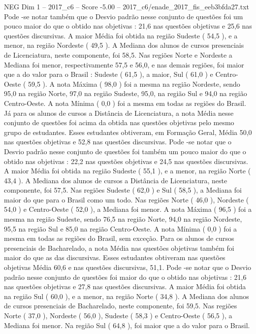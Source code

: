\begin{textsample}{NEG Dim 1 – 2017\_c6 – Score -5.00 – 2017\_c6/enade\_2017\_fis\_eeb3bfda27.txt}
Pode -se notar também que o Desvio padrão nesse conjunto de questões foi um pouco maior do que o obtido nas objetivas : 21,6 nas questões objetivas e 25,6 nas questões discursivas.
A maior Média foi obtida na região Sudeste ( 54,5 ), e a menor, na região Nordeste ( 49,5 ).
A Mediana dos alunos de cursos presenciais de Licenciatura, neste componente, foi 58,5.
Nas regiões Norte e Nordeste a Mediana foi menor, respectivamente 57,5 e 56,0, e nas demais regiões, foi maior que a do valor para o Brasil : Sudeste ( 61,5 ), a maior, Sul ( 61,0 ) e Centro-Oeste ( 59,5 ).
A nota Máxima ( 98,0 ) foi a mesma na região Nordeste, sendo 95,0 na região Norte, 97,0 na região Sudeste, 95,0, na região Sul e 94,0 na região Centro-Oeste.
A nota Mínima ( 0,0 ) foi a mesma em todas as regiões do Brasil.
Já para os alunos de cursos a Distância de Licenciatura, a nota Média nesse conjunto de questões foi acima da obtida nas questões objetivas pelo mesmo grupo de estudantes.
Esses estudantes obtiveram, em Formação Geral, Média 50,0 nas questões objetivas e 52,8 nas questões discursivas.
Pode -se notar que o Desvio padrão nesse conjunto de questões foi também um pouco maior do que o obtido nas objetivas : 22,2 nas questões objetivas e 24,5 nas questões discursivas.
A maior Média foi obtida na região Sudeste ( 55,1 ), e a menor, na região Norte ( 43,4 ).
A Mediana dos alunos de cursos a Distância de Licenciatura, neste componente, foi 57,5.
Nas regiões Sudeste ( 62,0 ) e Sul ( 58,5 ), a Mediana foi maior do que para o Brasil como um todo.
Nas regiões Norte ( 46,0 ), Nordeste ( 54,0 ) e Centro-Oeste ( 52,0 ), a Mediana foi menor.
A nota Máxima ( 96,5 ) foi a mesma na região Sudeste, sendo 76,5 na região Norte, 94,0 na região Nordeste, 95,5 na região Sul e 85,0 na região Centro-Oeste.
A nota Mínima ( 0,0 ) foi a mesma em todas as regiões do Brasil, sem exceção.
Para os alunos de cursos presenciais de Bacharelado, a nota Média nas questões objetivas também foi maior do que as das discursivas.
Esses estudantes obtiveram nas questões objetivas Média 60,6 e nas questões discursivas, 51,1.
Pode -se notar que o Desvio padrão nesse conjunto de questões foi maior do que o obtido nas objetivas : 21,6 nas questões objetivas e 27,8 nas questões discursivas.
A maior Média foi obtida na região Sul ( 60,0 ), e a menor, na região Norte ( 34,8 ).
A Mediana dos alunos de cursos presenciais de Bacharelado, neste componente, foi 59,5.
Nas regiões Norte ( 37,0 ), Nordeste ( 56,0 ), Sudeste ( 58,3 ) e Centro-Oeste ( 56,5 ), a Mediana foi menor.
Na região Sul ( 64,8 ), foi maior que a do valor para o Brasil.

\end{textsample}
